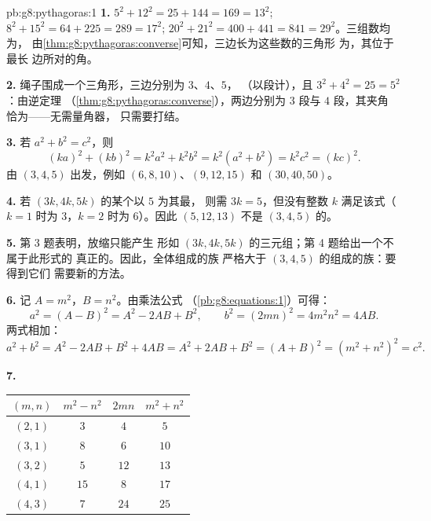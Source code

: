 \begin{solution}{pb:g8:pythagoras:1}
\textbf{1.} $5^2 + 12^2 = 25 + 144 = 169 = 13^2$; \quad
$8^2 + 15^2 = 64 + 225 = 289 = 17^2$; \quad
$20^2 + 21^2 = 400 + 441 = 841 = 29^2$。三组数均为，
由\cref{thm:g8:pythagoras:converse}可知，三边长为这些数的三角形
为，其位于最长
边所对的角。

\textbf{2.} 绳子围成一个三角形，三边分别为 $3$、$4$、$5$，
（以段计），且 $3^2 + 4^2 = 25 = 5^2$：由逆定理
（\cref{thm:g8:pythagoras:converse}），两边分别为 $3$ 段与 $4$ 段，其夹角
恰为——无需量角器，
只需要打结。

\textbf{3.} 若 $a^2 + b^2 = c^2$，则
\[
(ka)^2 + (kb)^2 = k^2 a^2 + k^2 b^2
= k^2\left(a^2 + b^2\right) = k^2 c^2 = (kc)^2 .
\]
由 $(3, 4, 5)$ 出发，例如 $(6, 8, 10)$、$(9, 12, 15)$ 和
$(30, 40, 50)$。

\textbf{4.} 若 $(3k, 4k, 5k)$ 的某个以 $5$ 为其最，
则需 $3k = 5$，但没有整数 $k$
满足该式（$k = 1$ 时为 $3$，$k = 2$ 时为 $6$）。因此
$(5, 12, 13)$ 不是 $(3, 4, 5)$ 的。

\textbf{5.} 第 3 题表明，放缩只能产生
形如 $(3k, 4k, 5k)$ 的三元组；第 4 题给出一个不属于此形式的
真正的。因此，全体组成的族
严格大于 $(3, 4, 5)$ 的组成的族：要得到它们
需要新的方法。

\textbf{6.} 记 $A = m^2$，$B = n^2$。由乘法公式
（\cref{pb:g8:equations:1}）可得：
\[
a^2 = (A - B)^2 = A^2 - 2AB + B^2,
\qquad
b^2 = (2mn)^2 = 4m^2n^2 = 4AB .
\]
两式相加：
\[
a^2 + b^2 = A^2 - 2AB + B^2 + 4AB
= A^2 + 2AB + B^2 = (A + B)^2
= \left(m^2 + n^2\right)^2 = c^2 .
\]

\textbf{7.}
\begin{center}
\renewcommand{\arraystretch}{1.2}
\begin{tabular}{c|ccc}
$(m, n)$ & $m^2 - n^2$ & $2mn$ & $m^2 + n^2$ \\
\hline
$(2, 1)$ & $3$ & $4$ & $5$ \\
$(3, 1)$ & $8$ & $6$ & $10$ \\
$(3, 2)$ & $5$ & $12$ & $13$ \\
$(4, 1)$ & $15$ & $8$ & $17$ \\
$(4, 3)$ & $7$ & $24$ & $25$ \\
\end{tabular}
\end{center}


\end{solution}
